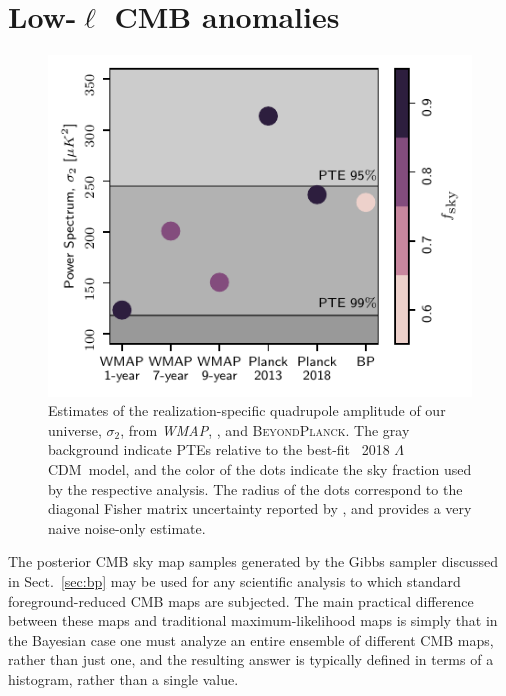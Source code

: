 \documentclass[twocolumn]{aa}
\def\WMAP{\textit{WMAP}}
\def\LCDM{$\Lambda$CDM}
\newcommand{\BP}{\textsc{BeyondPlanck}}
\begin{document}



\section{Low-$\ell$ CMB anomalies}
\label{sec:anomalies}

\begin{figure}
  \includegraphics[width=\linewidth]{figs/sigma_2_experiment.pdf}
  \caption{Estimates of the realization-specific quadrupole
    amplitude of our universe, $\sigma_2$, from \WMAP, \Planck, and
    \BP. The gray background indicate PTEs relative to the best-fit
    \Planck\ 2018 \LCDM\ model, and the color of the dots indicate the
    sky fraction used by the respective analysis. The radius of the
    dots correspond to the diagonal Fisher matrix uncertainty reported
    by \citet{hinshaw2012}, and provides a very naive noise-only
    estimate.}
  \label{fig:sigma_2_experiment}
\end{figure}



The posterior CMB sky map samples generated by the Gibbs sampler
discussed in Sect.~\ref{sec:bp} may be used for any scientific
analysis to which standard foreground-reduced CMB maps are
subjected. The main practical difference between these maps and
traditional maximum-likelihood maps is simply that in the Bayesian
case one must analyze an entire ensemble of different CMB maps, rather
than just one, and the resulting answer is typically defined in terms
of a histogram, rather than a single value.
\end{document}
